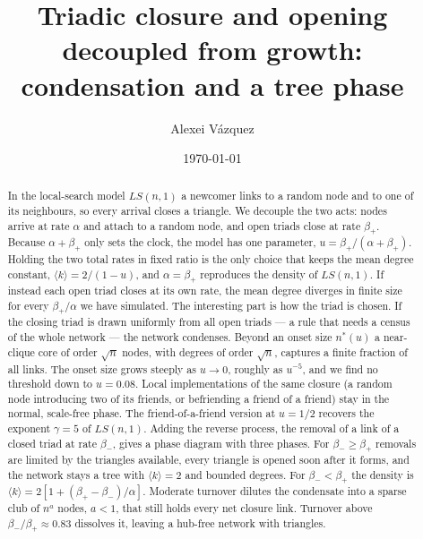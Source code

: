 \documentclass[aps,pre,twocolumn,superscriptaddress,floatfix,nofootinbib]{revtex4-2}
\begin{document}
\title{Triadic closure and opening decoupled from growth: condensation and a tree phase}

\author{Alexei V\'azquez}

\date{\today}

\begin{abstract}
In the local-search model $LS(n,1)$ a newcomer links to a random node and to
one of its neighbours, so every arrival closes a triangle. We decouple the two
acts: nodes arrive at rate $\alpha$ and attach to a random node, and open triads
close at rate $\beta_+$. Because $\alpha+\beta_+$ only sets the clock, the model has
one parameter, $u=\beta_+/(\alpha+\beta_+)$. Holding the two total rates in fixed
ratio is the only choice that keeps the mean degree constant,
$\langle k\rangle=2/(1-u)$, and $\alpha=\beta_+$ reproduces the density of
$LS(n,1)$. If instead each open triad closes at its own rate, the mean degree
diverges in finite size for every $\beta_+/\alpha$ we have simulated. The
interesting part is how the triad is chosen. If the closing triad is drawn
uniformly from all open triads --- a rule that needs a census of the whole
network --- the network condenses. Beyond an onset size $n^*(u)$ a near-clique
core of order $\sqrt n$ nodes, with degrees of order $\sqrt n$, captures a
finite fraction of all links. The onset size grows steeply as $u\to0$, roughly
as $u^{-5}$, and we find no threshold down to $u=0.08$. Local implementations of
the same closure (a random node introducing two of its friends, or befriending
a friend of a friend) stay in the normal, scale-free phase. The
friend-of-a-friend version at $u=1/2$ recovers the exponent $\gamma=5$ of
$LS(n,1)$. Adding the reverse process, the removal of a link of a closed triad
at rate $\beta_-$, gives a phase diagram with three phases. For
$\beta_-\ge\beta_+$ removals are limited by the triangles available, every
triangle is opened soon after it forms, and the network stays a tree with
$\langle k\rangle=2$ and bounded degrees. For $\beta_-<\beta_+$ the density is
$\langle k\rangle=2[1+(\beta_+-\beta_-)/\alpha]$. Moderate turnover dilutes the
condensate into a sparse club of $n^{a}$ nodes, $a<1$, that still holds every net
closure link. Turnover above $\beta_-/\beta_+\approx0.83$ dissolves it, leaving a
hub-free network with triangles.
\end{abstract}

\maketitle
\end{document}
